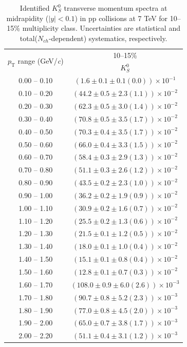 \begin{table}
\caption{Identified $K^{0}_{S}$ transverse momentum spectra at midrapidity ($|y|<0.1$) in pp collisions at 7 TeV for 10--15\% multiplicity class. Uncertainties are statistical and total($N_{ch}$-dependent) systematics, respectively.}
\label{tab:K0Short_10to15}
\begin{center}
\begin{tabular}{ c | c }
\hline
\multirow{2}{*}{$p_{\mathrm{T}}$ range (GeV/\textit{c})} & \multicolumn{1}{c}{10--15\%} \\ & $K^{0}_{S}$\\ 
\hline
0.00 -- 0.10 & $(1.6\pm0.1\pm0.1(0.0))\times10^{-1}$ \\ 
0.10 -- 0.20 & $(44.2\pm0.5\pm2.3(1.1))\times10^{-2}$ \\ 
0.20 -- 0.30 & $(62.3\pm0.5\pm3.0(1.4))\times10^{-2}$ \\ 
0.30 -- 0.40 & $(70.8\pm0.5\pm3.5(1.7))\times10^{-2}$ \\ 
0.40 -- 0.50 & $(70.3\pm0.4\pm3.5(1.7))\times10^{-2}$ \\ 
0.50 -- 0.60 & $(66.0\pm0.4\pm3.3(1.5))\times10^{-2}$ \\ 
0.60 -- 0.70 & $(58.4\pm0.3\pm2.9(1.3))\times10^{-2}$ \\ 
0.70 -- 0.80 & $(51.1\pm0.3\pm2.6(1.2))\times10^{-2}$ \\ 
0.80 -- 0.90 & $(43.5\pm0.2\pm2.3(1.0))\times10^{-2}$ \\ 
0.90 -- 1.00 & $(36.2\pm0.2\pm1.9(0.9))\times10^{-2}$ \\ 
1.00 -- 1.10 & $(30.9\pm0.2\pm1.6(0.7))\times10^{-2}$ \\ 
1.10 -- 1.20 & $(25.5\pm0.2\pm1.3(0.6))\times10^{-2}$ \\ 
1.20 -- 1.30 & $(21.5\pm0.1\pm1.2(0.5))\times10^{-2}$ \\ 
1.30 -- 1.40 & $(18.0\pm0.1\pm1.0(0.4))\times10^{-2}$ \\ 
1.40 -- 1.50 & $(15.1\pm0.1\pm0.8(0.4))\times10^{-2}$ \\ 
1.50 -- 1.60 & $(12.8\pm0.1\pm0.7(0.3))\times10^{-2}$ \\ 
1.60 -- 1.70 & $(108.0\pm0.9\pm6.0(2.6))\times10^{-3}$ \\ 
1.70 -- 1.80 & $(90.7\pm0.8\pm5.2(2.3))\times10^{-3}$ \\ 
1.80 -- 1.90 & $(77.0\pm0.8\pm4.5(2.0))\times10^{-3}$ \\ 
1.90 -- 2.00 & $(65.0\pm0.7\pm3.8(1.7))\times10^{-3}$ \\ 
2.00 -- 2.20 & $(51.1\pm0.4\pm3.1(1.2))\times10^{-3}$ \\ 

\end{tabular}
\end{center}
\end{table}
